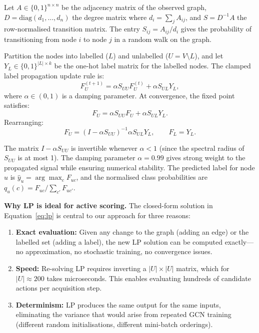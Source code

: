 \documentclass[12pt,a4paper,oneside]{report}
\begin{document}
Let $A \in \{0,1\}^{n \times n}$ be the adjacency matrix of the observed graph, $D = \text{diag}(d_1, \ldots, d_n)$ the degree matrix where $d_i = \sum_j A_{ij}$, and $S = D^{-1}A$ the row-normalised transition matrix. The entry $S_{ij} = A_{ij} / d_i$ gives the probability of transitioning from node $i$ to node $j$ in a random walk on the graph.

Partition the nodes into labelled ($L$) and unlabelled ($U = V \setminus L$), and let $Y_L \in \{0,1\}^{|L| \times k}$ be the one-hot label matrix for the labelled nodes. The clamped label propagation update rule is:
\begin{equation}
    F_U^{(t+1)} = \alpha S_{UU} F_U^{(t)} + \alpha S_{UL} Y_L,
\end{equation}
where $\alpha \in (0, 1)$ is a damping parameter. At convergence, the fixed point satisfies:
\begin{equation}
    F_U = \alpha S_{UU} F_U + \alpha S_{UL} Y_L.
\end{equation}
Rearranging:
\begin{equation}
\label{eq:lp}
    F_U = (I - \alpha S_{UU})^{-1} \alpha S_{UL} Y_L, \qquad F_L = Y_L.
\end{equation}

The matrix $I - \alpha S_{UU}$ is invertible whenever $\alpha < 1$ (since the spectral radius of $S_{UU}$ is at most 1). The damping parameter $\alpha = 0.99$ gives strong weight to the propagated signal while ensuring numerical stability. The predicted label for node $u$ is $\hat{y}_u = \arg\max_c F_{uc}$, and the normalised class probabilities are $q_u(c) = F_{uc} / \sum_{c'} F_{uc'}$.

\textbf{Why LP is ideal for active scoring.} The closed-form solution in Equation~\eqref{eq:lp} is central to our approach for three reasons:
\begin{enumerate}[leftmargin=2em]
    \item \textbf{Exact evaluation:} Given any change to the graph (adding an edge) or the labelled set (adding a label), the new LP solution can be computed exactly---no approximation, no stochastic training, no convergence issues.
    \item \textbf{Speed:} Re-solving LP requires inverting a $|U| \times |U|$ matrix, which for $|U| \approx 200$ takes microseconds. This enables evaluating hundreds of candidate actions per acquisition step.
    \item \textbf{Determinism:} LP produces the same output for the same inputs, eliminating the variance that would arise from repeated GCN training (different random initialisations, different mini-batch orderings).
\end{enumerate}
\end{document}
